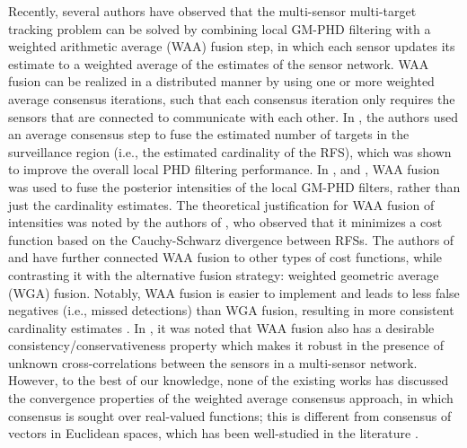 Recently, several authors have observed that the multi-sensor multi-target tracking problem can be solved by combining local GM-PHD filtering with a weighted arithmetic average (WAA) fusion step, in which each sensor updates its estimate to a weighted average of the estimates of the sensor network. WAA fusion can be realized in a distributed manner by using one or more weighted average consensus iterations, such that each consensus iteration only requires the sensors that are connected to communicate with each other.
In \cite{li2018cardinality}, the authors used an average consensus step to fuse the estimated number of targets in the surveillance region (i.e., the estimated cardinality of the RFS), which was shown to improve the overall local PHD filtering performance. In \cite{li2020parallel, li2021is}, and \cite{wu2022partial}, WAA fusion was used to fuse the posterior intensities of the local GM-PHD filters, rather than just the cardinality estimates. The theoretical justification for WAA fusion of intensities was noted by the authors of \cite{battistelli2020differentFOVs}, who observed that it minimizes a cost function based on the Cauchy-Schwarz divergence between RFSs. The authors of \cite{gao2020multiobject} and \cite{gostar2017cauchy} have further connected WAA fusion to other types of cost functions, while contrasting it with the alternative fusion strategy: weighted geometric average (WGA) fusion. Notably, WAA fusion is easier to implement and leads to less false negatives (i.e., missed detections) than WGA fusion, resulting in more consistent cardinality estimates \cite{li2021cphd, gostar2020cooperative}. In \cite{julier2012conservative}, it was noted that WAA fusion also has a desirable consistency/conservativeness property which makes it robust in the presence of unknown cross-correlations between the sensors in a multi-sensor network. However, to the best of our knowledge, none of the existing works has discussed the convergence properties of the weighted average consensus approach, in which consensus is sought over real-valued functions; this is different from consensus of vectors in Euclidean spaces, which has been well-studied in the literature \cite{olfati2007consensus,corless2012consensus}.

